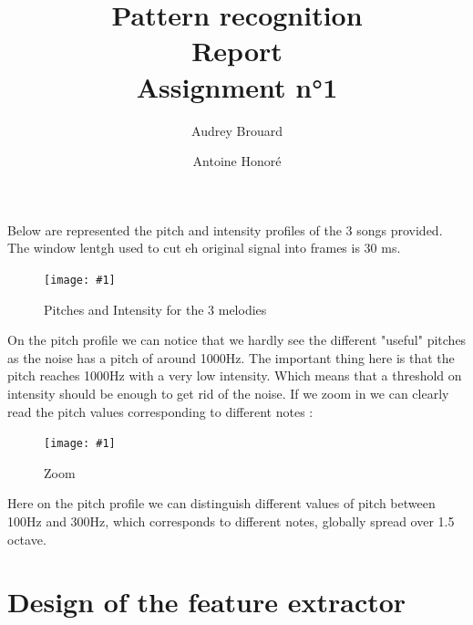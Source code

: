 \documentclass[a4paper]{report}
\title{Pattern recognition\\Report\\Assignment n°1}
\author{Audrey Brouard \and Antoine Honoré}
\newcommand{\img}[3]{\begin{figure}[!h] \centering \texttt{[image: \#1]}\captionsetup{justification=centering} \caption{#3} \label{#1} \end{figure}}
\begin{document}

\section{}


Below are represented the pitch and intensity profiles of the 3 songs provided. The window lentgh used to cut eh original signal into frames is 30 ms.
\img{Pitch_intens}{1.3}{Pitches and Intensity for the 3 melodies}

On the pitch profile we can notice that we hardly see the different "useful" pitches as the noise has a pitch of around 1000Hz. The important thing here is that the pitch reaches 1000Hz with a very low intensity. Which means that a threshold on intensity should be enough to get rid of the noise. If we zoom in we can clearly read the pitch values corresponding to different notes :

\img{Pitch_intens_zoom}{1.3}{Zoom}

Here on the pitch profile we can distinguish different values of pitch between 100Hz and 300Hz, which corresponds to different notes, globally spread over 1.5 octave.

\section{Design of the feature extractor}
\end{document}
